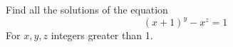 Find all the solutions of the equation \[\left(x+1\right)^y-x^z=1\] For $x,y,z$ integers greater than 1.